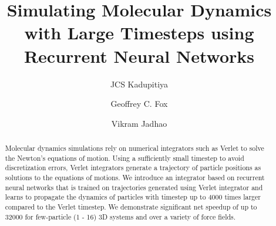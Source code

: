 \documentclass[aps,prl,twocolumn,superscriptaddress,tightenlines,longbibliography, reprint]{revtex4-1}
\begin{document}
\title{Simulating Molecular Dynamics with Large Timesteps using Recurrent Neural Networks}

\author{JCS Kadupitiya}
\author{Geoffrey C. Fox}
\author{Vikram Jadhao}

\begin{abstract}
Molecular dynamics simulations rely on numerical integrators such as Verlet to solve the Newton's equations of motion. Using a sufficiently small timestep to avoid discretization errors, Verlet integrators generate a trajectory of particle positions as solutions to the equations of motions. We introduce an integrator based on recurrent neural networks that is trained on trajectories generated using Verlet integrator and learns to propagate the dynamics of particles with timestep up to 4000 times larger compared to the Verlet timestep. We demonstrate significant net speedup of up to 32000 for few-particle (1 - 16) 3D systems and over a variety of force fields. 
\end{abstract}

\maketitle
\end{document}
